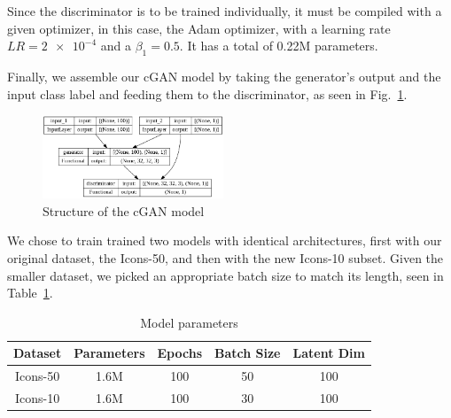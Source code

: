 Since the discriminator is to be trained individually, it must be compiled with a given optimizer, in this case, the Adam optimizer, with a learning rate $LR=\num{2e-4}$ and a $\beta_1=0.5$.
It has a total of 0.22M parameters.

Finally, we assemble our cGAN model by taking the generator's output and the input class label and feeding them to the discriminator, as seen in Fig.~\ref{fig:cGANStruct}.

\begin{figure}[htbp]
    \centering
    \includegraphics[width=0.48\textwidth]{images/summary/cgan}
    \caption{Structure of the cGAN model}
    \label{fig:cGANStruct}
\end{figure}

We chose to train trained two models with identical architectures, first with our original dataset, the Icons-50, and then with the new Icons-10 subset.
Given the smaller dataset, we picked an appropriate batch size to match its length, seen in Table~\ref{tab:ModelParams}.

\begin{table}[htbp]
    \centering
    \caption{Model parameters}
    \begin{tabular}{ccccc}
        \hline
        \textbf{Dataset} & \textbf{Parameters} & \textbf{Epochs} & \textbf{Batch Size} & \textbf{Latent Dim} \\ \hline
        Icons-50         & 1.6M                & 100             & 50                  & 100                 \\
        Icons-10         & 1.6M                & 100             & 30                  & 100                 \\ \hline
    \end{tabular}
    \label{tab:ModelParams}
\end{table}